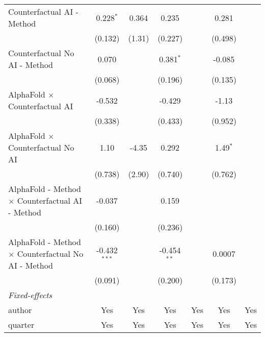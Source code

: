 \begin{tabular}{lcccccc}
   Counterfactual AI - Method                                 & 0.228$^{*}$    & 0.364   & 0.235         &             & 0.281         &   \\   
                                                              & (0.132)        & (1.31)  & (0.227)       &             & (0.498)       &   \\   
   Counterfactual No AI - Method                              & 0.070          &         & 0.381$^{*}$   &             & -0.085        &   \\   
                                                              & (0.068)        &         & (0.196)       &             & (0.135)       &   \\   
   AlphaFold $\times$ Counterfactual AI                       & -0.532         &         & -0.429        &             & -1.13         &   \\   
                                                              & (0.338)        &         & (0.433)       &             & (0.952)       &   \\   
   AlphaFold $\times$ Counterfactual No AI                    & 1.10           & -4.35   & 0.292         &             & 1.49$^{*}$    &   \\   
                                                              & (0.738)        & (2.90)  & (0.740)       &             & (0.762)       &   \\   
   AlphaFold - Method $\times$ Counterfactual AI - Method     & -0.037         &         & 0.159         &             &               &   \\   
                                                              & (0.160)        &         & (0.236)       &             &               &   \\   
   AlphaFold - Method $\times$ Counterfactual No AI - Method  & -0.432$^{***}$ &         & -0.454$^{**}$ &             & 0.0007        &   \\   
                                                              & (0.091)        &         & (0.200)       &             & (0.173)       &   \\   
   \midrule
   \emph{Fixed-effects}\\
   author                                                     & Yes            & Yes     & Yes           & Yes         & Yes           & Yes\\  
   quarter                                                    & Yes            & Yes     & Yes           & Yes         & Yes           & Yes\\  

\end{tabular}

